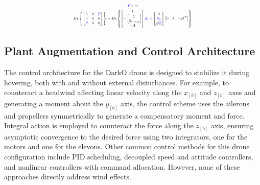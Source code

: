 \vspace{-0.5cm}


\begin{equation}
\centering
\resizebox{0.48\textwidth}{!}{$
    \begin{gathered}
        \textcolor{blue}{P} \succ 0 \\
        He\left\{ \begin{bmatrix}
            0 & 0 & \textcolor{blue}{P}\\
            0 & 0 & 0\\
            \textcolor{blue}{P} & 0 & 0
        \end{bmatrix}\right\}
    \prec
    He\left\{\begin{bmatrix}
            I\\
                -\begin{bmatrix}
                    C \\
                    0_{p-n,n}
                \end{bmatrix}\\
            -A
    \end{bmatrix}
    \textcolor{blue}{S_1} +
    \begin{bmatrix}
        0\\
        \textcolor{blue}{S_2}\\
        B\textcolor{blue}{Z}
    \end{bmatrix}
    \begin{bmatrix}
        0 & I & -H^T
    \end{bmatrix}\right\}
    \end{gathered}$}
    \label{ValidMatrixIneq}
\end{equation}


\subsection{Plant Augmentation and Control Architecture}
\label{3b}

The control architecture for the DarkO drone is designed to stabilize it during hovering, both with and without external disturbances. For example, to counteract a headwind affecting linear velocity along the $x_{[b]}$ and $z_{[b]}$ axes and generating a moment about the $y_{[b]}$ axis, the control scheme uses the ailerons and propellers symmetrically to generate a compensatory moment and force. Integral action is employed to counteract the force along the $z_{[b]}$ axis, ensuring asymptotic convergence to the desired force using two integrators, one for the motors and one for the elevons. Other common control methods for this drone configuration include PID scheduling, decoupled speed and attitude controllers, and nonlinear controllers with command allocation. However, none of these approaches directly address wind effects.

